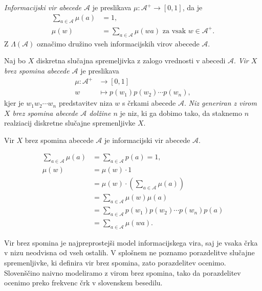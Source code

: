 \documentclass[fin1, tisk]{fmfdelo}
\newcommand{\A}{\mathcal{A}}
\theoremstyle{definition}
\begin{document}
\begin{definicija}
    \emph{Informacijski vir abecede $\A$} je preslikava $\mu \colon \A^+ \to [0,1]$, da je 
    \begin{align*}
        \sum_{a \in \A} \mu(a) &= 1, \\
        \mu(w) &= \sum_{a \in \A} \mu(wa) \text{ za vsak } w \in \A^+.
    \end{align*}
    Z $\Lambda(\A)$ označimo družino vseh informacijskih virov abecede $\A$.
\end{definicija}

\begin{definicija} %
    Naj bo $X$ diskretna slučajna spremeljivka z zalogo vrednosti v abecedi $\A$.
    \emph{Vir $X$ brez spomina abecede $\A$} je preslikava
    \begin{align*}
        \mu \colon \A^+ &\to [0,1] \\
        w &\mapsto p(w_1)p(w_2) \cdots p(w_n),
    \end{align*}
    kjer je $w_1w_2 \cdots w_n$ predstavitev niza $w$ s črkami abecede $\A$.
    \emph{Niz generiran z virom $X$ brez spomina abecede $\A$ dolžine $n$} je niz, ki 
    ga dobimo tako, da staknemo $n$ realziacij diskretne slučajne spremenljivke $X$.
\end{definicija}

\begin{trditev}
    Vir $X$ brez spomina abecede $\A$ je informacijski vir abecede $\A$.
\end{trditev}

\begin{dokaz}
    \begin{align*}
        \sum_{a \in \A} \mu(a) &= \sum_{a \in \A} p(a) = 1, \\
        \mu(w) &= \mu(w) \cdot 1 \\
        &= \mu(w) \cdot \left( \sum_{a \in \A} \mu(a) \right) \\
        &= \sum_{a \in \A} \mu(w)\mu(a) \\
        &= \sum_{a \in \A} p(w_1) p(w_2) \cdots p(w_n) p(a) \\
        &= \sum_{a \in \A} \mu(wa).
    \end{align*}
\end{dokaz}

Vir brez spomina je najpreprostejši model informacijskega vira, saj je vsaka črka v nizu neodvisna
od vseh ostalih. V splošnem ne poznamo porazdelitve slučajne spremenljivke, ki
definira vir brez spomina, zato porazdelitev ocenimo. Slovenščino naivno modeliramo z virom brez
spomina, tako da porazdelitev ocenimo preko frekvenc črk v slovenskem besedilu.
\end{document}
